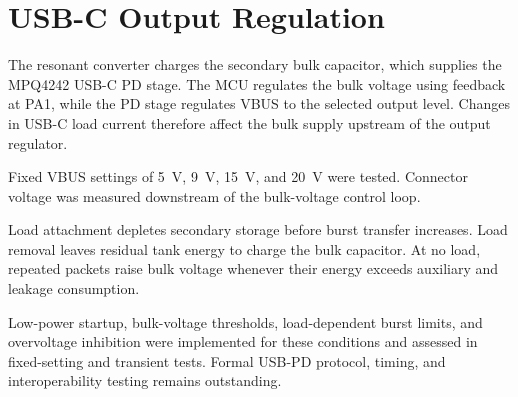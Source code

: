 \section{USB-C Output Regulation}
\label{sec:bg-usbc}

The resonant converter charges the secondary bulk capacitor, which supplies the MPQ4242 USB-C PD stage. The MCU regulates the bulk voltage using feedback at PA1, while the PD stage regulates VBUS to the selected output level. Changes in USB-C load current therefore affect the bulk supply upstream of the output regulator.

Fixed VBUS settings of \SI{5}{\volt}, \SI{9}{\volt}, \SI{15}{\volt}, and \SI{20}{\volt} were tested. Connector voltage was measured downstream of the bulk-voltage control loop.

Load attachment depletes secondary storage before burst transfer increases. Load removal leaves residual tank energy to charge the bulk capacitor. At no load, repeated packets raise bulk voltage whenever their energy exceeds auxiliary and leakage consumption.

Low-power startup, bulk-voltage thresholds, load-dependent burst limits, and overvoltage inhibition were implemented for these conditions and assessed in fixed-setting and transient tests. Formal USB-PD protocol, timing, and interoperability testing remains outstanding.
